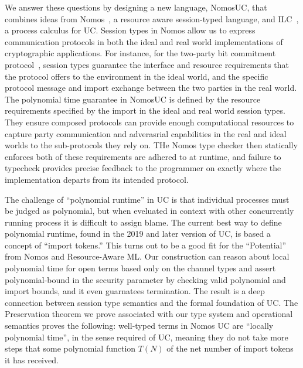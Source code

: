 We answer these questions by designing a new language, NomosUC, that combines ideas from
Nomos~\cite{dasnomos}, a resource aware session-typed language, and ILC~\cite{ilc},
a process calculus for UC.
Session types in Nomos allow us to express communication protocols in both the ideal and
real world implementations of cryptographic applications.
For instance, for the two-party bit commitment protocol~\cite{rocommitment}, session types guarantee
the interface and resource requirements that the protocol offers to the environment in the ideal world, and the specific protocol 
message and import exchange between the two parties in the real world.
The polynomial time guarantee in NomosUC is defined by the resource requirements specified by the import in the ideal and real world
session types.
They ensure composed protocols can provide enough computational resources to capture party communication and adverasrial capabilities in the real and ideal worlds to the sub-protocols they rely on.
THe Nomos type checker then statically enforces both of these requirements are adhered to at runtime, and  
failure to typecheck provides precise feedback to the programmer on exactly where the
implementation departs from its intended protocol.


   The challenge of “polynomial runtime” in UC is that individual processes must be judged as polynomial, but when eveluated in context with other concurrently running process it is difficult to assign blame.
       The current best way to define polynomial runtime, found in the 2019 and later version of UC, is based a concept of ``import tokens.''
       This turns out to be a good fit for the ``Potential'' from Nomos and Resource-Aware ML.
Our construction can reason about local polynomial time for open terms based only on the channel types and assert polynomial-bound in the security parameter by checking valid polynomial and import bounds, and it even guarnatees termination.
The result is a deep connection between session type semantics and the formal foundation of UC.
    The Preservation theorem we prove associated with our type system and operational semantics proves the following: 
  well-typed terms in Nomos UC are “locally polynomial time”, in the sense required of UC, meaning they do not take more steps that some polynomial function $T(N)$ of the net number of import tokens it has received.




